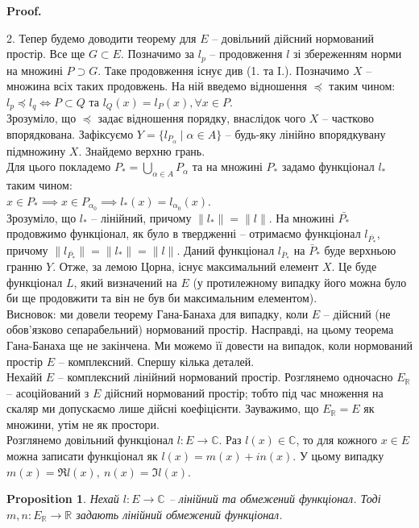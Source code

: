 \documentclass[a4paper, 10pt]{article}
\makeatletter
\theoremstyle{theoremdd}
\theoremstyle{theoremdd}
\theoremstyle{theoremdd}
\theoremstyle{theoremdd}
\theoremstyle{theoremdd}
\newtheorem{proposition}[theorem]{Proposition}
\theoremstyle{theoremdd}
\theoremstyle{theoremdd}
\theoremstyle{theoremdd}
\renewenvironment{proof}[1][Proof.\\]{\par
\pushQED{\hfill \qed}%
\normalfont \topsep6\p@\@plus6\p@\relax
\trivlist
\item\relax
{\bfseries
#1\@addpunct{.}}\hspace\labelsep\ignorespaces
}{%
\popQED\endtrivlist\@endpefalse
}
\makeatother
\begin{document}
\begin{proof}
2. Тепер будемо доводити теорему для $E$ -- довільний дійсний нормований простір. Все ще $G \subset E$. Позначимо за $l_p$ -- продовження $l$  зі збереженням норми на множині $P \supset G$. Таке продовження існує див (1. та I.). Позначимо $X$ -- множина всіх таких продовжень. На ній введемо відношення $\preceq$ таким чином:\\
$l_p \preceq l_q \iff P \subset Q$ та $l_Q(x) = l_P(x), \forall x \in P$.\\
Зрозуміло, що $\preceq$ задає відношення порядку, внаслідок чого $X$ -- частково впорядкована. Зафіксуємо $Y = \{l_{P_\alpha} \mid \alpha \in A\}$ -- будь-яку лінійно впорядкувану підмножину $X$. Знайдемо верхню грань.\\
Для цього покладемо $P_* = \displaystyle\bigcup_{\alpha \in A} P_\alpha$ та на множині $P_*$ задамо функціонал $l_*$ таким чином:\\
$x \in P_* \implies x \in P_{\alpha_0} \implies l_*(x) = l_{\alpha_0}(x)$.\\
Зрозуміло, що $l_*$ -- лінійний, причому $\|l_*\| = \|l\|$. На множині $\bar{P_*}$ продовжимо функціонал, як було в твердженні -- отримаємо функціонал $l_{\bar{P_*}}$, причому $\|l_{\bar{P_*}}\| = \|l_*\| = \|l\|$. Даний функціонал $l_{\bar{P}_*}$ на $\bar{P}_*$ буде верхньою гранню $Y$. Отже, за лемою Цорна, існує максимальний елемент $X$. Це буде функціонал $L$, який визначений на $E$ (у протилежному випадку його можна було би ще продовжити та він не був би максимальним елементом).\\
Висновок: ми довели теорему Гана-Банаха для випадку, коли $E$ -- дійсний (не обов'язково сепарабельний) нормований простір.
\end{proof}
\noindent
Насправді, на цьому теорема Гана-Банаха ще не закінчена. Ми можемо її довести на випадок, коли нормований простір $E$ -- комплексний. Спершу кілька деталей.\\
Нехайй $E$ -- комплексний лінійний нормований простір. Розглянемо одночасно $E_{\mathbb{R}}$ -- асоційований з $E$ дійсний нормований простір; тобто під час множення на скаляр ми допускаємо лише дійсні коефіцієнти. Зауважимо, що $E_{\mathbb{R}} = E$ як множини, утім не як простори.\\
Розглянемо довільний функціонал $l \colon E \to \mathbb{C}$. Раз $l(x) \in \mathbb{C}$, то для кожного $x \in E$ можна записати функціонал як $l(x) = m(x) + i n(x)$. У цьому випадку $m(x) = \Re l(x),\ n(x) = \Im l(x)$.

\begin{proposition}
Нехай $l \colon E \to \mathbb{C}$ -- лінійний та обмежений функціонал. Тоді $m,n \colon E_{\mathbb{R}} \to \mathbb{R}$ задають лінійний обмежений функціонал.
\end{proposition}
\end{document}
